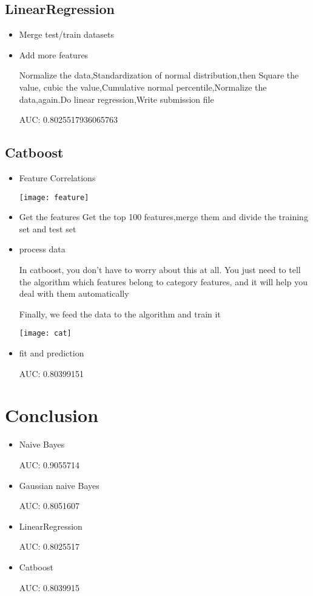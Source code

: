 \subsection{LinearRegression}
\begin{itemize}
\item Merge test/train datasets
\par
\item Add more features
\par
Normalize the data,Standardization of normal distribution,then Square the value, cubic the value,Cumulative normal percentile,Normalize the data,again.Do linear regression,Write submission file
\par
AUC:  0.8025517936065763
\end{itemize}

\subsection{Catboost}
\begin{itemize}
\item Feature Correlations
\par
\texttt{[image: feature]}
\item Get the features
Get the top 100 features,merge them and divide the training set and test set
\item process data
\par
In catboost, you don't have to worry about this at all. You just need to tell the algorithm which features belong to category features, and it will help you deal with them automatically
\par
Finally, we feed the data to the algorithm and train it
\par
\texttt{[image: cat]}
\par
\item fit and prediction
\par
AUC: 0.80399151
\end{itemize}
\newpage
\section{Conclusion}
\begin{itemize}
\item Naive Bayes
\par
AUC: 0.9055714
\item Gaussian naive Bayes
\par
AUC: 0.8051607
\item LinearRegression
\par
AUC: 0.8025517

\item Catboost
\par
AUC: 0.8039915

\end{itemize} 